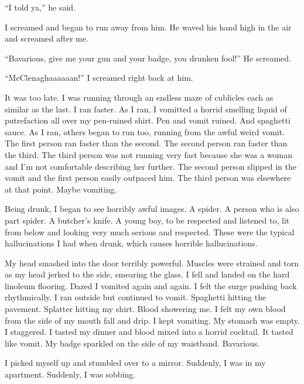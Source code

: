 ``I told ya,'' he said.

I screamed and began to run away from him. He waved his hand high
in the air and screamed after me.

``Bavarious, give me your gun and your badge, you drunken fool!'' He
screamed.

``McClenaghaaaaaan!'' I screamed right back at him.

It was too late. I was running through an endless maze of cublicles
each as similar as the last. I ran faster. As I ran, I vomitted a
horrid smelling liquid of putrefaction all over my pen-ruined
shirt. Pen and vomit ruined. And spaghetti sauce. As I ran, others
began to run too, running from the awful weird vomit. The first
person ran faster than the second. The second person ran faster
than the third. The third person was not running very fast because
she was a woman and I'm not comfortable describing her further. The
second person slipped in the vomit and the first person easily
outpaced him. The third person was elsewhere at that point. Maybe
vomiting.

Being drunk, I began to see horribly awful images. A spider. A
person who is also part spider. A butcher's knife. A young boy, to
be respected and listened to, lit from below and looking very much
serious and respected. These were the typical hallucinations I had
when drunk, which causes horrible hallucinations.

My head smashed into the door terribly powerful. Muscles were
strained and torn as my head jerked to the side, smearing the
glass. I fell and landed on the hard linoleum flooring. Dazed I
vomited again and again. I felt the surge pushing back
rhythmically. I ran outside but continued to vomit. Spaghetti
hitting the pavement. Splatter hitting my shirt. Blood showering
me. I felt my own blood from the side of my mouth fall and drip. I
kept vomiting. My stomach was empty. I staggered. I tasted my
dinner and blood mixed into a horrid cocktail. It tasted like
vomit. My badge sparkled on the side of my waistband.
Bavarious.

I picked myself up and stumbled over to a mirror. Suddenly, I was
in my apartment. Suddenly, I was sobbing. 

 




